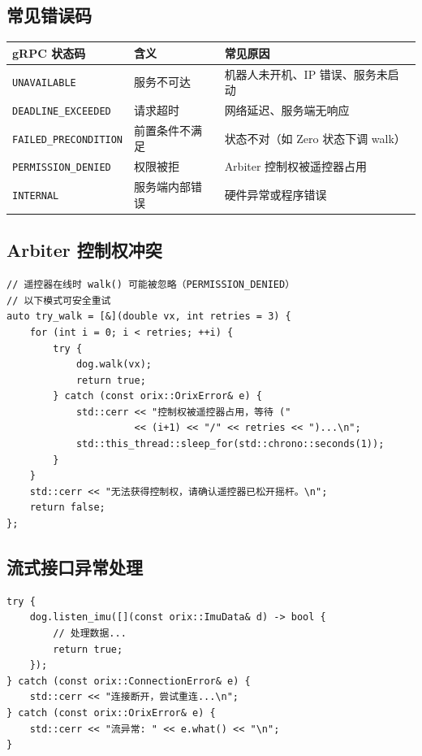 \documentclass[a4paper,11pt,openany]{book}
\begin{document}
\subsection{常见错误码}

\begin{longtable}{lll}
\toprule
gRPC 状态码 & 含义 & 常见原因 \\
\midrule
\endhead
\texttt{UNAVAILABLE} & 服务不可达 & 机器人未开机、IP 错误、服务未启动 \\
\texttt{DEADLINE\_EXCEEDED} & 请求超时 & 网络延迟、服务端无响应 \\
\texttt{FAILED\_PRECONDITION} & 前置条件不满足 & 状态不对（如 Zero 状态下调 walk）\\
\texttt{PERMISSION\_DENIED} & 权限被拒 & Arbiter 控制权被遥控器占用 \\
\texttt{INTERNAL} & 服务端内部错误 & 硬件异常或程序错误 \\
\bottomrule
\end{longtable}

\subsection{Arbiter 控制权冲突}

\begin{lstlisting}[style=cpp]
// 遥控器在线时 walk() 可能被忽略（PERMISSION_DENIED）
// 以下模式可安全重试
auto try_walk = [&](double vx, int retries = 3) {
    for (int i = 0; i < retries; ++i) {
        try {
            dog.walk(vx);
            return true;
        } catch (const orix::OrixError& e) {
            std::cerr << "控制权被遥控器占用，等待 ("
                      << (i+1) << "/" << retries << ")...\n";
            std::this_thread::sleep_for(std::chrono::seconds(1));
        }
    }
    std::cerr << "无法获得控制权，请确认遥控器已松开摇杆。\n";
    return false;
};
\end{lstlisting}

\subsection{流式接口异常处理}

\begin{lstlisting}[style=cpp]
try {
    dog.listen_imu([](const orix::ImuData& d) -> bool {
        // 处理数据...
        return true;
    });
} catch (const orix::ConnectionError& e) {
    std::cerr << "连接断开，尝试重连...\n";
} catch (const orix::OrixError& e) {
    std::cerr << "流异常: " << e.what() << "\n";
}
\end{lstlisting}
\end{document}

